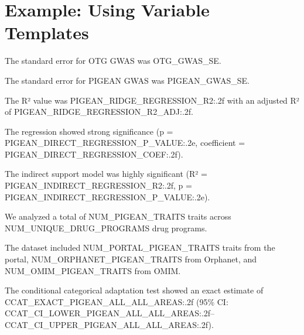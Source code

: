 
\section{Example: Using Variable Templates}


The standard error for OTG GWAS was {{OTG_GWAS_SE}}.

The standard error for PIGEAN GWAS was {{PIGEAN_GWAS_SE}}.


The R² value was {{PIGEAN_RIDGE_REGRESSION_R2:.2f}} with
an adjusted R² of {{PIGEAN_RIDGE_REGRESSION_R2_ADJ:.2f}}.

The regression showed strong significance
(p = {{PIGEAN_DIRECT_REGRESSION_P_VALUE:.2e}},
coefficient = {{PIGEAN_DIRECT_REGRESSION_COEF:.2f}}).

The indirect support model was highly significant
(R² = {{PIGEAN_INDIRECT_REGRESSION_R2:.2f}},
p = {{PIGEAN_INDIRECT_REGRESSION_P_VALUE:.2e}}).


We analyzed a total of {{NUM_PIGEAN_TRAITS}} traits across
{{NUM_UNIQUE_DRUG_PROGRAMS}} drug programs.

The dataset included {{NUM_PORTAL_PIGEAN_TRAITS}} traits from the portal,
{{NUM_ORPHANET_PIGEAN_TRAITS}} from Orphanet, and
{{NUM_OMIM_PIGEAN_TRAITS}} from OMIM.


The conditional categorical adaptation test showed an exact estimate of
{{CCAT_EXACT_PIGEAN_ALL_ALL_AREAS:.2f}}
(95\% CI: {{CCAT_CI_LOWER_PIGEAN_ALL_ALL_AREAS:.2f}}--{{CCAT_CI_UPPER_PIGEAN_ALL_ALL_AREAS:.2f}}).

